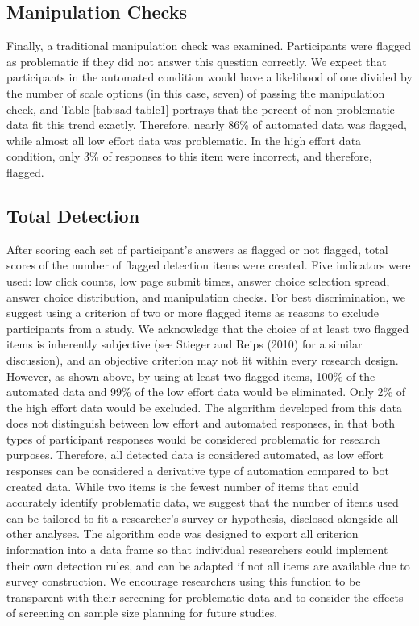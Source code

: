 \documentclass[english,man]{apa6}
\theoremstyle{definition}
\theoremstyle{definition}
\theoremstyle{definition}
\theoremstyle{remark}
\begin{document}
\subsection{Manipulation Checks}\label{manipulation-checks}

Finally, a traditional manipulation check was examined. Participants
were flagged as problematic if they did not answer this question
correctly. We expect that participants in the automated condition would
have a likelihood of one divided by the number of scale options (in this
case, seven) of passing the manipulation check, and Table
\ref{tab:sad-table1} portrays that the percent of non-problematic data
fit this trend exactly. Therefore, nearly 86\% of automated data was
flagged, while almost all low effort data was problematic. In the high
effort data condition, only 3\% of responses to this item were
incorrect, and therefore, flagged.

\subsection{Total Detection}\label{total-detection}

After scoring each set of participant's answers as flagged or not
flagged, total scores of the number of flagged detection items were
created. Five indicators were used: low click counts, low page submit
times, answer choice selection spread, answer choice distribution, and
manipulation checks. For best discrimination, we suggest using a
criterion of two or more flagged items as reasons to exclude
participants from a study. We acknowledge that the choice of at least
two flagged items is inherently subjective (see Stieger and Reips (2010)
for a similar discussion), and an objective criterion may not fit within
every research design. However, as shown above, by using at least two
flagged items, 100\% of the automated data and 99\% of the low effort
data would be eliminated. Only 2\% of the high effort data would be
excluded. The algorithm developed from this data does not distinguish
between low effort and automated responses, in that both types of
participant responses would be considered problematic for research
purposes. Therefore, all detected data is considered automated, as low
effort responses can be considered a derivative type of automation
compared to bot created data. While two items is the fewest number of
items that could accurately identify problematic data, we suggest that
the number of items used can be tailored to fit a researcher's survey or
hypothesis, disclosed alongside all other analyses. The algorithm code
was designed to export all criterion information into a data frame so
that individual researchers could implement their own detection rules,
and can be adapted if not all items are available due to survey
construction. We encourage researchers using this function to be
transparent with their screening for problematic data and to consider
the effects of screening on sample size planning for future studies.
\end{document}
